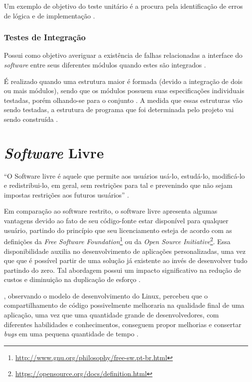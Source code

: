         Um exemplo de objetivo do teste unitário é a procura pela identificação de erros de lógica e de implementação \cite{maldonado}.

        \subsubsection{Testes de Integração}
        Possui como objetivo averiguar a existência de falhas relacionadas a interface do \textit{software} entre seus diferentes módulos quando estes são integrados \cite{artigo_intro_teste}.

        É realizado quando uma estrutura maior é formada (devido a integração de dois ou mais módulos), sendo que os módulos possuem suas especificações individuais testadas, porém olhando-se para o conjunto \cite{sw_test_tech}. A medida que essas estruturas vão sendo testadas, a estrutura de programa que foi determinada pelo projeto vai sendo construída \cite{maldonado}.

\section{\textit{Software} Livre}
``O Software livre é aquele que permite aos usuários usá-lo, estudá-lo, modificá-lo e redistribui-lo, em geral, sem restrições para tal e prevenindo que não sejam impostas restrições aos futuros usuários'' \cite{meirelles2013}.

Em comparação ao software restrito, o software livre apresenta algumas vantagens devido ao fato de seu código-fonte estar disponível para qualquer usuário, partindo do princípio que seu licenciamento esteja de acordo com as definições da \textit{Free Software Foundation}\footnote{\url{http://www.gnu.org/philosophy/free-sw.pt-br.html}} ou da \textit{Open Source Initiative}\footnote{\url{https://opensource.org/docs/definition.html}}. Essa disponibilidade auxilia no desenvolvimento de aplicações personalizadas, uma vez que que é possível partir de uma solução já existente ao invés de desenvolver tudo partindo do zero. Tal abordagem possui um impacto significativo na redução de custos e diminuição na duplicação de esforço \cite{meirelles2013}.

\cite{raymond1999}, observando o modelo de desenvolvimento do Linux, percebeu que o compartilhamento de código possivelmente melhoraria na qualidade final de uma aplicação, uma vez que uma quantidade grande de desenvolvedores, com diferentes habilidades e conhecimentos, conseguem propor melhorias e consertar \textit{bugs} em uma pequena quantidade de tempo \cite{meirelles2013}.

